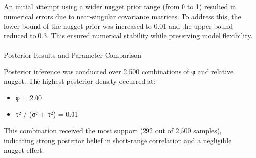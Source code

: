\documentclass[
  11pt,
]{article}
\makeatletter
\let\oldparagraph\paragraph
\renewcommand{\paragraph}{
    \@ifstar
      \xxxParagraphStar
      \xxxParagraphNoStar
  }
\newcommand{\xxxParagraphStar}[1]{\oldparagraph*{#1}\mbox{}}
\newcommand{\xxxParagraphNoStar}[1]{\oldparagraph{#1}\mbox{}}
\newenvironment{Shaded}{\begin{snugshade}}{\end{snugshade}}
\newcommand{\AttributeTok}[1]{\textcolor[rgb]{0.40,0.45,0.13}{#1}}
\newcommand{\DecValTok}[1]{\textcolor[rgb]{0.68,0.00,0.00}{#1}}
\newcommand{\FloatTok}[1]{\textcolor[rgb]{0.68,0.00,0.00}{#1}}
\newcommand{\FunctionTok}[1]{\textcolor[rgb]{0.28,0.35,0.67}{#1}}
\newcommand{\NormalTok}[1]{\textcolor[rgb]{0.00,0.23,0.31}{#1}}
\newcommand{\OtherTok}[1]{\textcolor[rgb]{0.00,0.23,0.31}{#1}}
\newcommand{\SpecialCharTok}[1]{\textcolor[rgb]{0.37,0.37,0.37}{#1}}
\newcommand{\StringTok}[1]{\textcolor[rgb]{0.13,0.47,0.30}{#1}}
\providecommand{\tightlist}{%
  \setlength{\itemsep}{0pt}\setlength{\parskip}{0pt}}\usepackage{longtable,booktabs,array}
\makeatother
\begin{document}
An initial attempt using a wider nugget prior range (from 0 to 1)
resulted in numerical errors due to near-singular covariance matrices.
To address this, the lower bound of the nugget prior was increased to
0.01 and the upper bound reduced to 0.3. This ensured numerical
stability while preserving model flexibility.

\begin{Shaded}
\end{Shaded}

\paragraph{Posterior Results and Parameter
Comparison}\label{posterior-results-and-parameter-comparison}

Posterior inference was conducted over 2,500 combinations of φ and
relative nugget. The highest posterior density occurred at:

\begin{itemize}
\tightlist
\item
  φ = 2.00\\
\item
  τ² / (σ² + τ²) = 0.01
\end{itemize}

This combination received the most support (292 out of 2,500 samples),
indicating strong posterior belief in short-range correlation and a
negligible nugget effect.
\end{document}
